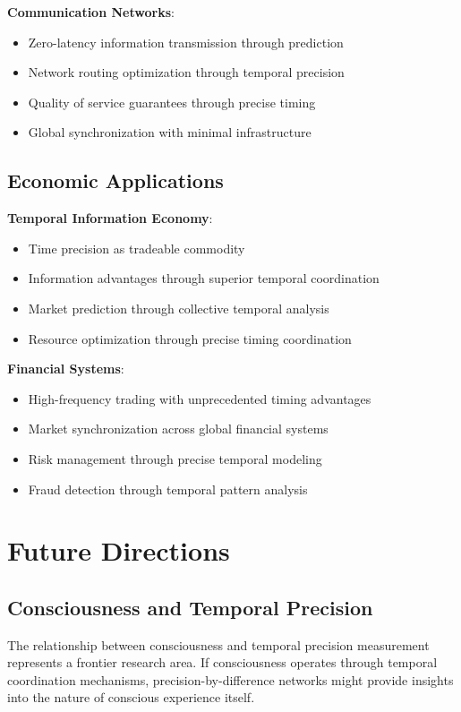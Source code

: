 \documentclass[12pt,a4paper]{article}
\begin{document}
\textbf{Communication Networks}:
\begin{itemize}
\item Zero-latency information transmission through prediction
\item Network routing optimization through temporal precision
\item Quality of service guarantees through precise timing
\item Global synchronization with minimal infrastructure
\end{itemize}

\subsection{Economic Applications}

\textbf{Temporal Information Economy}:
\begin{itemize}
\item Time precision as tradeable commodity
\item Information advantages through superior temporal coordination
\item Market prediction through collective temporal analysis
\item Resource optimization through precise timing coordination
\end{itemize}

\textbf{Financial Systems}:
\begin{itemize}
\item High-frequency trading with unprecedented timing advantages
\item Market synchronization across global financial systems
\item Risk management through precise temporal modeling
\item Fraud detection through temporal pattern analysis
\end{itemize}

\section{Future Directions}

\subsection{Consciousness and Temporal Precision}

The relationship between consciousness and temporal precision measurement represents a frontier research area. If consciousness operates through temporal coordination mechanisms, precision-by-difference networks might provide insights into the nature of conscious experience itself.
\end{document}
